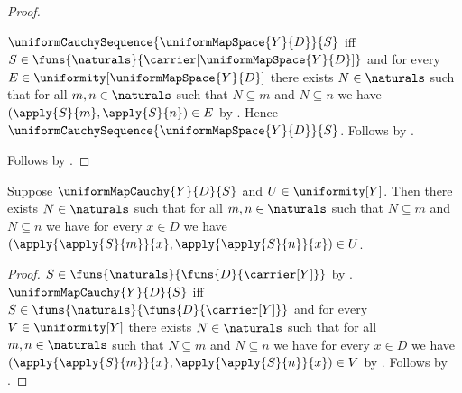 \begin{proof}
\begin{subproof}
\begin{subproof}
        \end{subproof}
        $\uniformCauchySequence{\uniformMapSpace{Y}{D}}{S}$ iff
            $S\in\funs{\naturals}
                {\carrier[\uniformMapSpace{Y}{D}]}$ and for every
            $E\in\uniformity[\uniformMapSpace{Y}{D}]$ there exists
            $N\in\naturals$ such that for all $m,n\in\naturals$ such that
            $N\subseteq m$ and $N\subseteq n$ we have
            $(\apply{S}{m},\apply{S}{n})\in E$ by
            .
        Hence $\uniformCauchySequence{\uniformMapSpace{Y}{D}}{S}$.
        Follows by .
    \end{subproof}
    Follows by \auto.
\end{proof}

\begin{proposition}\label{uniform_map_cauchy_entourage}
    Suppose $\uniformMapCauchy{Y}{D}{S}$ and $U\in\uniformity[Y]$.
    Then there exists $N\in\naturals$ such that for all
        $m,n\in\naturals$ such that $N\subseteq m$ and $N\subseteq n$ we
        have for every $x\in D$ we have
            $(\apply{\apply{S}{m}}{x},
             \apply{\apply{S}{n}}{x})\in U$.
\end{proposition}
\begin{proof}
    $S\in\funs{\naturals}{\funs{D}{\carrier[Y]}}$ by
        .
    $\uniformMapCauchy{Y}{D}{S}$ iff
        $S\in\funs{\naturals}{\funs{D}{\carrier[Y]}}$ and for every
        $V\in\uniformity[Y]$ there exists $N\in\naturals$ such that for all
        $m,n\in\naturals$ such that $N\subseteq m$ and $N\subseteq n$ we
        have for every $x\in D$ we have
            $(\apply{\apply{S}{m}}{x},
             \apply{\apply{S}{n}}{x})\in V$ by
        .
    Follows by \auto.
\end{proof}

